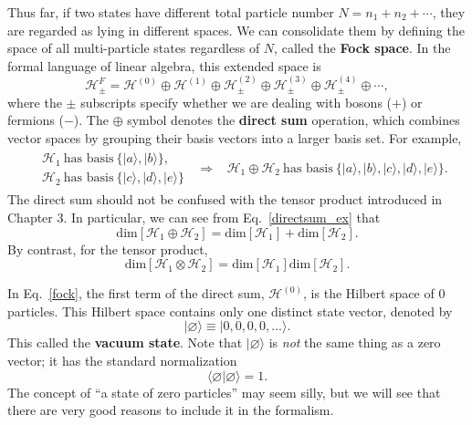 \documentclass[prx,12pt]{revtex4-2}
\begin{document}
Thus far, if two states have different total particle number $N = n_1 +
n_2 + \cdots$, they are regarded as lying in different spaces.  We can
consolidate them by defining the space of all multi-particle states
regardless of $N$, called the \textbf{Fock space}.  In the formal
language of linear algebra, this extended space is
\begin{equation}
  \mathscr{H}_\pm^F = \mathscr{H}^{(0)} \oplus \mathscr{H}^{(1)} \oplus \mathscr{H}^{(2)}_\pm \oplus \mathscr{H}^{(3)}_\pm \oplus \mathscr{H}^{(4)}_\pm \oplus \cdots,
  \label{fock}
\end{equation}
where the $\pm$ subscripts specify whether we are dealing with bosons
($+$) or fermions ($-$).  The $\oplus$ symbol denotes the
\textbf{direct sum} operation, which combines vector spaces by
grouping their basis vectors into a larger basis set.  For example,
\begin{align}
  \begin{aligned}
    &\mathscr{H}_1~\textrm{has basis}~\big\{ |a\rangle, |b\rangle \big\}, \\
    &\mathscr{H}_2~\textrm{has basis}~\big\{ |c\rangle, |d\rangle, |e\rangle \big\}
  \end{aligned}
  \;\;\Rightarrow\;\;\;
\mathscr{H}_1 \oplus \mathscr{H}_2~\textrm{has basis}~\big\{ |a\rangle, |b\rangle, |c\rangle, |d\rangle, |e\rangle \big\}.
\label{directsum_ex}
\end{align}
The direct sum should not be confused with the tensor product
introduced in Chapter 3.  In particular, we can see from
Eq.~\eqref{directsum_ex} that
\begin{equation}
  \mathrm{dim}\left[\mathscr{H}_1 \oplus \mathscr{H}_2\right]
  = \mathrm{dim}\left[\mathscr{H}_1\right] +
  \mathrm{dim}\left[\mathscr{H}_2\right].
\end{equation}
By contrast, for the tensor product,
\begin{equation}
  \mathrm{dim}\left[\mathscr{H}_1 \otimes \mathscr{H}_2\right]
  = \mathrm{dim}\left[\mathscr{H}_1\right] 
  \mathrm{dim}\left[\mathscr{H}_2\right].
\end{equation}

In Eq.~\eqref{fock}, the first term of the direct sum,
$\mathscr{H}^{(0)}$, is the Hilbert space of 0 particles.  This
Hilbert space contains only one distinct state vector, denoted by
\begin{equation}
  |\varnothing\rangle \equiv |0,0,0,0,\dots\rangle.
\end{equation}
This called the \textbf{vacuum state}.  Note that
$|\varnothing\rangle$ is \textit{not} the same thing as a zero vector;
it has the standard normalization
\begin{equation}
  \langle\varnothing|\varnothing\rangle = 1.
\end{equation}
The concept of ``a state of zero particles'' may seem silly, but we
will see that there are very good reasons to include it in the
formalism.
\end{document}
